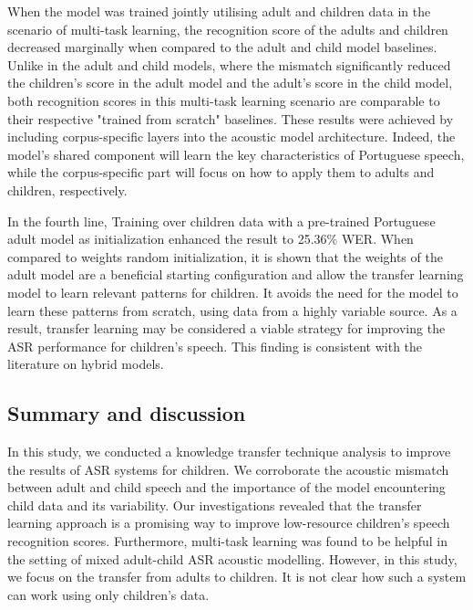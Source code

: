 When the model was trained jointly utilising adult and children data in the scenario of multi-task learning, the recognition score of the adults and children decreased marginally when compared to the adult and child model baselines. Unlike in the adult and child models, where the mismatch significantly reduced the children's score in the adult model and the adult's score in the child model, both recognition scores in this multi-task learning scenario are comparable to their respective "trained from scratch" baselines. These results were achieved by including corpus-specific layers into the acoustic model architecture. 
Indeed, the model's shared component will learn the key characteristics of Portuguese speech, while the corpus-specific part will focus on how to apply them to adults and children, respectively.

In the fourth line, Training over children data with a pre-trained Portuguese adult model as initialization enhanced the result to 25.36\% WER. When compared to weights random initialization, it is shown that the weights of the adult model are a beneficial starting configuration and allow the transfer learning model to learn relevant patterns for children. It avoids the need for the model to learn these patterns from scratch, using data from a highly variable source. As a result, transfer learning may be considered a viable strategy for improving the ASR performance for children's speech. This finding is consistent with the literature on hybrid models\cite{TransferLF,TFchildren}. 


\subsection{Summary and discussion}
In this study, we conducted a knowledge transfer technique analysis to improve the results of ASR systems for children. We corroborate the acoustic mismatch between adult and child speech and the importance of the model encountering child data and its variability. Our investigations revealed that the transfer learning approach is a promising way to improve low-resource children's speech recognition scores. Furthermore, multi-task learning was found to be helpful in the setting of mixed adult-child ASR acoustic modelling.
However, in this study, we focus on the transfer from adults to children. It is not clear how such a system can work using only children's data.




